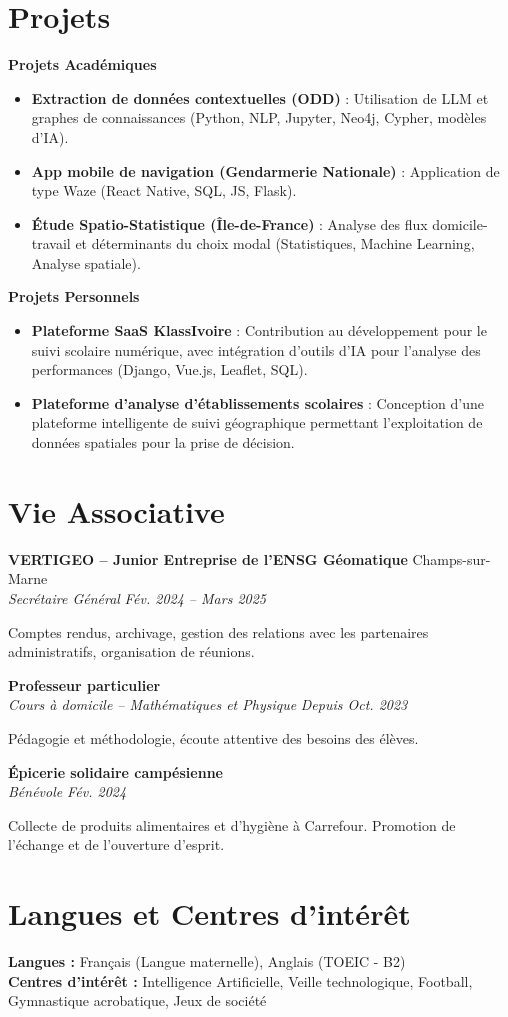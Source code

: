 \documentclass[11pt, a4paper]{article}
\newcommand{\cventry}[4]{
    \vspace{0.2cm}
    \noindent \textbf{#1} \hfill #2 \\
    \noindent \textit{#3} \hfill \textit{#4} \par
    \vspace{0.12cm}
}
\begin{document}
\section*{Projets}

\noindent \textbf{Projets Académiques}
\begin{itemize}[leftmargin=0.5cm, nosep]
    \item \textbf{Extraction de données contextuelles (ODD)} : Utilisation de LLM et graphes de connaissances (Python, NLP, Jupyter, Neo4j, Cypher, modèles d’IA).
    \item \textbf{App mobile de navigation (Gendarmerie Nationale)} : Application de type Waze (React Native, SQL, JS, Flask).
    \item \textbf{Étude Spatio-Statistique (Île-de-France)} : Analyse des flux domicile-travail et déterminants du choix modal (Statistiques, Machine Learning, Analyse spatiale).
\end{itemize}

\vspace{0.2cm}
\noindent \textbf{Projets Personnels}
\begin{itemize}[leftmargin=0.5cm, nosep]
    \item \textbf{Plateforme SaaS KlassIvoire} : Contribution au développement pour le suivi scolaire numérique, avec intégration d’outils d'IA pour l'analyse des performances (Django, Vue.js, Leaflet, SQL).
    \item \textbf{Plateforme d'analyse d'établissements scolaires} : Conception d’une plateforme intelligente de suivi géographique permettant l’exploitation de données spatiales pour la prise de décision.
\end{itemize}

\section*{Vie Associative}

\cventry{VERTIGEO -- Junior Entreprise de l'ENSG Géomatique}{Champs-sur-Marne}{Secrétaire Général}{Fév. 2024 -- Mars 2025}
\noindent Comptes rendus, archivage, gestion des relations avec les partenaires administratifs, organisation de réunions.

\cventry{Professeur particulier}{}{Cours à domicile -- Mathématiques et Physique}{Depuis Oct. 2023}
\noindent Pédagogie et méthodologie, écoute attentive des besoins des élèves.

\cventry{Épicerie solidaire campésienne}{}{Bénévole}{Fév. 2024}
\noindent Collecte de produits alimentaires et d'hygiène à Carrefour. Promotion de l'échange et de l'ouverture d'esprit.

\section*{Langues et Centres d'intérêt}
\noindent \textbf{Langues :} Français (Langue maternelle), Anglais (TOEIC - B2) \\[0.1cm]
\textbf{Centres d'intérêt :} Intelligence Artificielle, Veille technologique, Football, Gymnastique acrobatique, Jeux de société
\end{document}

